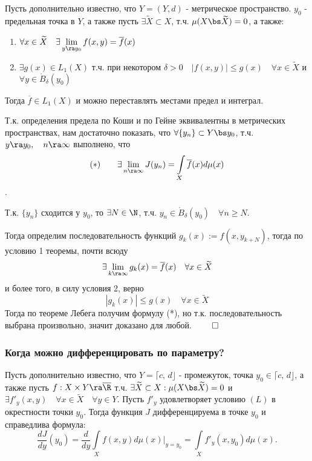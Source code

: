\theorem Пусть дополнительно известно, что $Y = (Y, d)$ - метрическое пространство. $y_0$ - предельная точка в $Y$, а также пусть $\exists \widetilde{X} \subset X$, т.ч. $\mu(X \bs \widetilde{X}) = 0$, а также:
\begin{enumerate}
    \item $\forall x \in \widetilde{X} \quad \exists \lim\limits_{y \ra y_0} f(x, y) = \overline{f}(x)$
    \item $\exists g(x) \in L_1(X)$ т.ч. при некотором $\delta > 0 \quad \left| f(x,y)\right| \leq g(x) \quad \forall x \in \widetilde{X}$ и $\forall y \in \mathring{B}_\delta(y_0)$
\end{enumerate}


Тогда $\overline{f} \in L_1(X)$ и можно переставлять местами предел и интеграл. 

\proof Т.к. определения предела по Коши и по Гейне эквивалентны в метрических пространствах, нам достаточно показать, что $\forall \{y_n\} \subset Y \bs y_0$, т.ч. $y \ra y_0, \quad n \ra \infty$ выполнено, что
$$(*) \qquad \exists \lim\limits_{n \ra \infty} J(y_n) = \int\limits_{X} \overline{f}(x) d\mu(x)$$.

Т.к. $\{y_n\}$ сходится у $y_0$, то $\exists N \in \N$, т.ч. $y_n \in \mathring{B}_\delta(y_0) \quad \forall n \geq N$.

Тогда определим последовательность функций $g_k(x) := f(x, y_{k + N})$, тогда по условию 1 теоремы, почти всюду
$$\exists \lim\limits_{k \ra \infty}g_k(x) = \overline{f}(x) \quad \forall x \in \widetilde{X}$$
и более того, в силу условия 2, верно
$$\left| g_k(x) \right| \leq g(x) \quad \forall x \in \widetilde{X}$$
Тогда по теореме Лебега получим формулу (*), но т.к. последовательность выбрана произвольно, значит доказано для любой. $\qed$

\subsubsection{Когда можно дифференцировать по параметру?}

\theorem Пусть дополнительно известно, что $Y = \lceil c, \, d\rfloor$ - промежуток, точка $y_0 \in \lceil c, \, d\rfloor$, а также пусть $f : X \times Y \ra \overline{\R}$ т.ч. $\exists \widetilde{X} \subset X : \mu(X \bs \widetilde{X}) = 0$ и $\exists f'_y(x, y) \quad \forall x \in \widetilde{X} \quad \forall y \in Y$. Пусть $f'_y$ удовлетворяет условию $(L)$ в окрестности точки $y_0$. Тогда функция $J$ дифференцируема в точке $y_0$ и справедлива формула:
$$\frac{d J}{d y}(y_0) = \frac{d}{d y} \int\limits_X f(x, y) d \mu(x) \Bigg|_{y=y_0} = \int\limits_X f'_y(x, y_0) d \mu(x).$$

